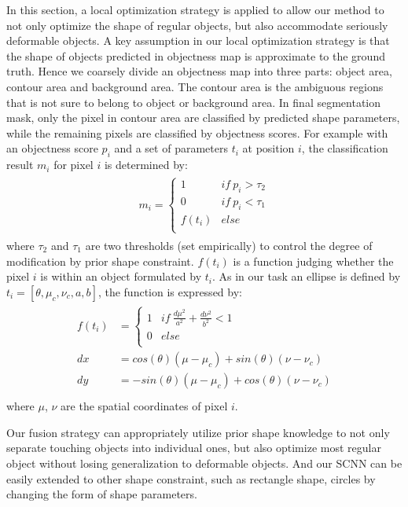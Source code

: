 In this section, a local optimization strategy is applied to allow our method to not only optimize the shape of regular objects, but also accommodate seriously deformable objects.
A key assumption in our local optimization strategy is that the shape of objects predicted in objectness map is approximate to the ground truth.
Hence we coarsely divide an objectness map into three parts: object area, contour area and background area.
The contour area is the ambiguous regions that is not sure to belong to object or background area.
In final segmentation mask, only the pixel in contour area are classified by predicted shape parameters, while the remaining pixels are classified by objectness scores.
For example with an objectness score $p_i$ and a set of parameters $t_i$ at position $i$, the classification result $m_i$ for pixel $i$ is determined by:
%
\begin{eqnarray}\label{fusion}
\begin{aligned}
m_i=\left\{\begin{array}{cc}
1&if~p_i>\tau_2\\
0&if~p_i<\tau_1\\
f(t_i)&else\\
\end{array}\right.
\end{aligned}
\end{eqnarray}
where $\tau_2$ and $\tau_1$ are two thresholds (set empirically) to control the degree of modification by prior shape constraint.
$f(t_i)$ is a function judging whether the pixel $i$ is within an object formulated by $t_i$.
As in our task an ellipse is defined by $ t_i = [\theta, \mu_c, \nu_c, a, b]$, the function is expressed by:
\begin{eqnarray}\label{fusion}
\begin{aligned}
f(t_i)&=\left\{\begin{array}{cc}
1&if~\frac{d\mu^2}{a^2}+\frac{d\nu^2}{b^2}<1\\
0&else\\
\end{array}\right.\\
dx &= cos(\theta)(\mu-\mu_c)+sin(\theta)(\nu-\nu_c)\\
dy &= -sin(\theta)(\mu-\mu_c)+cos(\theta)(\nu-\nu_c)\\
\end{aligned}
\end{eqnarray}
where $\mu$, $\nu$ are the spatial coordinates of pixel $i$. 

Our fusion strategy can appropriately utilize prior shape knowledge to not only separate touching objects into individual ones, but also optimize most regular object without losing generalization to deformable objects.
And our SCNN can be easily extended to other shape constraint, such as rectangle shape, circles by changing the form of shape parameters.
